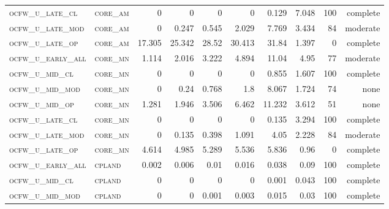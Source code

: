 \begin{landscape}
\begin{center}
\begin{footnotesize}
\begin{longtable}{llrrrrr|rrr}
\textsc{ocfw\_u\_late\_cl  } & \textsc{core\_am  }    & 0        & 0        & 0        & 0        & 0.129     & 7.048         & 100           & complete            \\
\textsc{ocfw\_u\_late\_mod } & \textsc{core\_am  }    & 0        & 0.247    & 0.545    & 2.029    & 7.769     & 3.434         & 84            & moderate       \\
\textsc{ocfw\_u\_late\_op  } & \textsc{core\_am  }    & 17.305   & 25.342   & 28.52    & 30.413   & 31.84     & 1.397         & 0             & complete           \\
\textsc{ocfw\_u\_early\_all} & \textsc{core\_mn  }    & 1.114    & 2.016    & 3.222    & 4.894    & 11.04     & 4.95          & 77            & moderate       \\
\textsc{ocfw\_u\_mid\_cl   } & \textsc{core\_mn  }    & 0        & 0        & 0        & 0        & 0.855     & 1.607         & 100           & complete            \\
\textsc{ocfw\_u\_mid\_mod  } & \textsc{core\_mn  }    & 0        & 0.24     & 0.768    & 1.8      & 8.067     & 1.724         & 74            & none       \\
\textsc{ocfw\_u\_mid\_op   } & \textsc{core\_mn  }    & 1.281    & 1.946    & 3.506    & 6.462    & 11.232    & 3.612         & 51            & none       \\
\textsc{ocfw\_u\_late\_cl  } & \textsc{core\_mn  }    & 0        & 0        & 0        & 0        & 0.135     & 3.294         & 100           & complete            \\
\textsc{ocfw\_u\_late\_mod } & \textsc{core\_mn  }    & 0        & 0.135    & 0.398    & 1.091    & 4.05      & 2.228         & 84            & moderate       \\
\textsc{ocfw\_u\_late\_op  } & \textsc{core\_mn  }    & 4.614    & 4.985    & 5.289    & 5.536    & 5.836     & 0.96          & 0             & complete           \\
\textsc{ocfw\_u\_early\_all} & \textsc{cpland    }    & 0.002    & 0.006    & 0.01     & 0.016    & 0.038     & 0.09          & 100           & complete            \\
\textsc{ocfw\_u\_mid\_cl   } & \textsc{cpland    }    & 0        & 0        & 0        & 0        & 0.001     & 0.043         & 100           & complete            \\
\textsc{ocfw\_u\_mid\_mod  } & \textsc{cpland    }    & 0        & 0        & 0.001    & 0.003    & 0.015     & 0.03          & 100           & complete            \\

\end{longtable}
\end{footnotesize}
\end{center}
\end{landscape}
